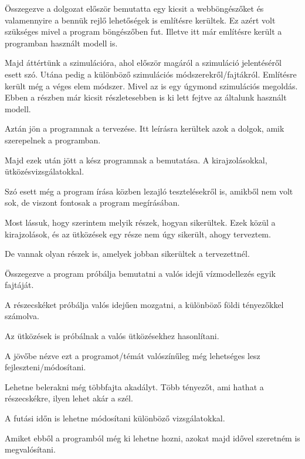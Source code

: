 


Összegezve a dolgozat először bemutatta egy kicsit a webböngészőket és valamennyire a bennük rejlő lehetőségek is említésre kerültek. Ez azért volt szükséges mivel a program böngészőben fut. Illetve itt már említésre került a programban használt modell is. 

Majd áttértünk a szimulációra, ahol először magáról a szimuláció jelentéséről esett szó. Utána pedig a különböző szimulációs módszerekről/fajtákról. Említésre került még a véges elem módszer. Mivel az is egy úgymond szimulációs megoldás. Ebben a részben már kicsit részletesebben is ki lett fejtve az általunk használt modell.

Aztán jön a programnak a tervezése. Itt leírásra kerültek azok a dolgok, amik szerepelnek a programban. 


Majd ezek után jött a kész programnak a bemutatása. A kirajzolásokkal, ütközésvizsgálatokkal. 

Szó esett még a program írása közben lezajló tesztelésekről is, amikből nem volt sok, de viszont fontosak a program megírásában. 


Most lássuk, hogy szerintem melyik részek, hogyan sikerültek. Ezek közül a kirajzolások, és az ütközések egy része nem úgy sikerült, ahogy terveztem. 

De vannak olyan részek is, amelyek jobban sikerültek a tervezettnél. 


Összegezve a program próbálja bemutatni a valós idejű vízmodellezés egyik fajtáját. 

A részecskéket próbálja valós idejűen mozgatni, a különböző földi tényezőkkel számolva. 

Az ütközések is próbálnak a valós ütközésekhez hasonlítani. 

A jövőbe nézve ezt a programot/témát valószínűleg még lehetséges lesz fejleszteni/módosítani.

Lehetne belerakni még többfajta akadályt. Több tényezőt, ami hathat a részecskékre, ilyen lehet akár a szél. 

A futási időn is lehetne módosítani különböző vizsgálatokkal. 

Amiket ebből a programból még ki lehetne hozni, azokat majd idővel szeretném is megvalósítani. 
